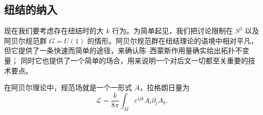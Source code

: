 \documentclass[11pt,a4paper]{article}
\begin{document}

\subsection{纽结的纳入}

现在我们要考虑存在纽结时的大 $k$ 行为。为简单起见，我们把讨论限制在 $S^3$ 以及
阿贝尔规范群 $G=U(1)$ 的情形。阿贝尔规范群在纽结理论的语境中相对平凡，
但它提供了一条快速而简单的途径，来确认陈–西蒙斯作用量确实给出拓扑不变量；
同时它也提供了一个简单的场合，用来说明一个对后文一切都至关重要的技术要点。

在阿贝尔理论中，规范场就是一个一形式 $A$，拉格朗日量为
\begin{equation}
    \mathcal{L}=\frac{k}{8\pi}\int_M \varepsilon^{ijk}A_i\partial_jA_k .
    \tag{2.27}
\end{equation}

%
\end{document}
